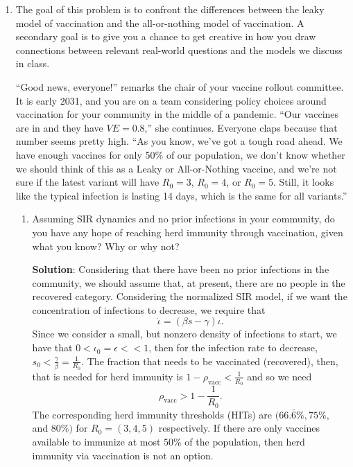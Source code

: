 \documentclass[11pt]{article}
\begin{document}
\begin{enumerate}
\begin{enumerate}[label=\alph*.]
\end{enumerate}

\clearpage
\item The goal of this problem is to confront the differences between the leaky model of vaccination and the all-or-nothing model of vaccination. A secondary goal is to give you a chance to get creative in how you draw connections between relevant real-world questions and the models we discuss in class. 

``Good news, everyone!'' remarks the chair of your vaccine rollout committee. It is early 2031, and you are on a team considering policy choices around vaccination for your community in the middle of a pandemic. ``Our vaccines are in and they have $VE=0.8$,'' she continues. Everyone claps because that number seems pretty high. ``As you know, we've got a tough road ahead. We have enough vaccines for only 50\% of our population, we don't know whether we should think of this as a Leaky or All-or-Nothing vaccine, and we're not sure if the latest variant will have $R_0=3$, $R_0=4$, or $R_0=5$. Still, it looks like the typical infection is lasting 14 days, which is the same for all variants.''
\begin{enumerate}[label=\alph*.]
	\item Assuming SIR dynamics and no prior infections in your community, do you have any hope of reaching herd immunity through vaccination, given what you know? Why or why not?
	\begin{tcolorbox}
		\textbf{Solution}: Considering that there have been no prior infections in the community, we should assume that, at present, there are no people in the recovered category. Considering the normalized SIR model, if we want the concentration of infections to decrease, we require that
		\begin{equation*}
			\dot{\iota} = (\beta s-\gamma)\iota.
		\end{equation*}
		Since we consider a small, but nonzero density of infections to start, we have that $0<\iota_0 = \epsilon <<1$, then for the infection rate to decrease, $s_0<\frac{\gamma}{\beta}=\frac{1}{R_0}$. The fraction that needs to be vaccinated (recovered), then, that is needed for herd immunity is $1-\rho_{\text{vacc}}<\frac{1}{R_0}$ and so we need
		\begin{equation*}
			\rho_{\text{vacc}}>1-\frac{1}{R_0}.
		\end{equation*}
		The corresponding herd immunity thresholds (HITs) are $(66.\bar{6}\%, 75\%,$ and $80\%)$ for $R_0=(3, 4, 5)$ respectively. If there are only vaccines available to immunize at most $50\%$ of the population, then herd immunity via vaccination is not an option.

\end{tcolorbox}
\end{enumerate}
\end{enumerate}
\end{document}
